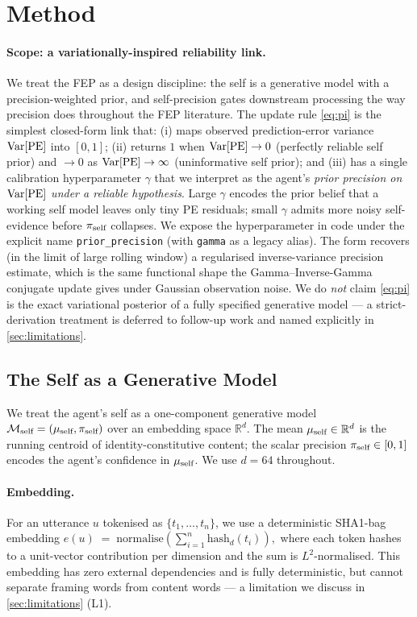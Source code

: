 \section{Method}
\label{sec:method}

\paragraph{Scope: a variationally-inspired reliability link.}
We treat the FEP as a design discipline: the self is a generative model
with a precision-weighted prior, and self-precision gates downstream
processing the way precision does throughout the FEP literature. The
update rule \cref{eq:pi} is the simplest closed-form link that:
(i) maps observed prediction-error variance $\mathrm{Var}[\mathrm{PE}]$ into $[0,1]$;
(ii) returns $1$ when $\mathrm{Var}[\mathrm{PE}] \to 0$ (perfectly reliable self prior)
and $\to 0$ as $\mathrm{Var}[\mathrm{PE}] \to \infty$ (uninformative self prior); and
(iii) has a single calibration hyperparameter $\gamma$ that we interpret
as the agent's \emph{prior precision on $\mathrm{Var}[\mathrm{PE}]$ under a reliable
hypothesis}. Large $\gamma$ encodes the prior belief that a working
self model leaves only tiny PE residuals; small $\gamma$ admits more
noisy self-evidence before $\pi_{\text{self}}$ collapses. We expose the
hyperparameter in code under the explicit name
\texttt{prior\_precision} (with \texttt{gamma} as a legacy alias).
The form recovers (in the limit of large rolling window) a regularised
inverse-variance precision estimate, which is the same functional shape
the Gamma--Inverse-Gamma conjugate update gives under Gaussian
observation noise. We do \emph{not} claim \cref{eq:pi} is the exact
variational posterior of a fully specified generative model --- a
strict-derivation treatment is deferred to follow-up work and named
explicitly in \cref{sec:limitations}.

\subsection{The Self as a Generative Model}
\label{sec:method:self}

We treat the agent's self as a one-component generative model
$\mathcal{M}_{\text{self}} = (\mu_{\text{self}},\pi_{\text{self}})$ over an embedding space $\mathbb{R}^d$.
The mean $\mu_{\text{self}} \in \mathbb{R}^d$ is the running centroid of
identity-constitutive content; the scalar precision
$\pi_{\text{self}} \in [0,1]$ encodes the agent's confidence in $\mu_{\text{self}}$.
We use $d = 64$ throughout.

\paragraph{Embedding.}
For an utterance $u$ tokenised as $\{t_1,\dots,t_n\}$, we use a
deterministic SHA1-bag embedding
\(
e(u) \;=\;
\mathrm{normalise}\!
\left(\sum_{i=1}^{n} \mathrm{hash}_d(t_i)\right),
\)
where each token hashes to a unit-vector contribution per dimension and
the sum is $L^2$-normalised. This embedding has zero external
dependencies and is fully deterministic, but cannot separate framing
words from content words --- a limitation we discuss in
\cref{sec:limitations} (L1).

